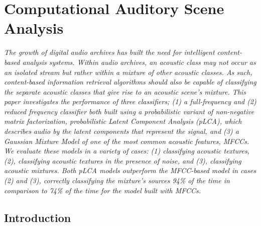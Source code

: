 \documentclass[a4paper,11pt,final]{ThesisStyle}
\newenvironment{abstract}{\rightskip1in\itshape}{}
\begin{document}





\chapter{Computational Auditory Scene Analysis}
\minitoc

\begin{abstract}
The growth of digital audio archives has built the need for intelligent content-based analysis systems.  Within audio archives, an acoustic class may not occur as an isolated stream but rather within a mixture of other acoustic classes.  As such, content-based information retrieval algorithms should also be capable of classifying the separate acoustic classes that give rise to an acoustic scene's mixture.  This paper investigates the performance of three classifiers; (1) a full-frequency and (2) reduced frequency classifier both built using a probabilistic variant of non-negative matrix factorization, probabilistic Latent Component Analysis (pLCA), which describes audio by the latent components that represent the signal, and (3) a Gaussian Mixture Model of one of the most common acoustic features, MFCCs.  We evaluate these models in a variety of cases: (1) classifying acoustic textures, (2), classifying acoustic textures in the presence of noise, and (3), classifying acoustic mixtures.  Both pLCA models outperform the MFCC-based model in cases (2) and (3), correctly classifying the mixture's sources 94\% of the time in comparison to 74\% of the time for the model built with MFCCs.
\end{abstract}

\section{Introduction}
\end{document}
